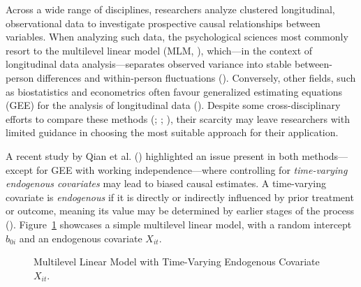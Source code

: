 \documentclass[
  12pt,
  a4paper,
]{article}
\begin{document}
Across a wide range of disciplines, researchers analyze clustered
longitudinal, observational data to investigate prospective causal
relationships between variables. When analyzing such data, the
psychological sciences most commonly resort to the multilevel linear
model (MLM, ),
which---in the context of longitudinal data analysis---separates
observed variance into stable between-person differences and
within-person fluctuations (). Conversely, other fields, such as biostatistics and
econometrics often favour generalized estimating equations (GEE) for the
analysis of longitudinal data (). Despite some cross-disciplinary efforts to compare these
methods (;
; ), their scarcity may leave researchers with limited
guidance in choosing the most suitable approach for their application.

A recent study by Qian et al. ()
highlighted an issue present in both methods---except for GEE with
working independence---where controlling for \emph{time-varying
endogenous covariates} may lead to biased causal estimates. A
time-varying covariate is \emph{endogenous} if it is directly or
indirectly influenced by prior treatment or outcome, meaning its value
may be determined by earlier stages of the process
().
Figure~\ref{fig-endogenous-example} showcases a simple multilevel linear
model, with a random intercept \(b_{0i}\) and an endogenous covariate
\(X_{it}\).

\begin{figure}[H]

\caption{\label{fig-endogenous-example}Multilevel Linear Model with
Time-Varying Endogenous Covariate \(X_{it}\).}


\end{figure}%
\end{document}
